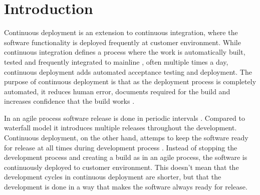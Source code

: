 \documentclass[conference]{IEEEtran}
\begin{document}
%


\IEEEpeerreviewmaketitle




%



\section{Introduction} %

Continuous deployment is an extension to continuous integration, where the software functionality is deployed frequently at customer environment. While continuous integration defines a process where the work is automatically built, tested and frequently integrated to mainline \cite{fowler2006continuous}, often multiple times a day, continuous deployment adds automated acceptance testing and deployment. The purpose of continuous deployment is that as the deployment process is completely automated, it reduces human error, documents required for the build and increases confidence that the build works \cite{cdbook}. 

In an agile process software release is done in periodic intervals \cite{cockburn2002agile}. Compared to waterfall model it introduces multiple releases throughout the development. Continuous deployment, on the other hand, attemps to keep the software ready for release at all times during development process \cite{cdbook}. Instead of stopping the development process and creating a build as in an agile process, the software is continuously deployed to customer environment. This doesn't mean that the development cycles in continuous deployment are shorter, but that the development is done in a way that makes the software always ready for release.
\end{document}
